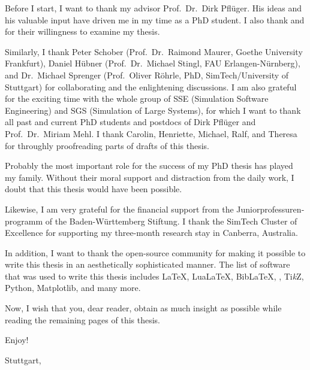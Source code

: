 
Before I start, I want to thank my advisor Prof.\ Dr.\ Dirk Pflüger.
His ideas and his valuable input have driven me in
my time as a PhD student.
I also thank \theexamineri{} and \theexaminerii{}
for their willingness to examine my thesis.

Similarly, I thank
Peter Schober
(Prof.\ Dr.\ Raimond Maurer, Goethe University Frankfurt),
Daniel Hübner
(Prof.\ Dr.\ Michael Stingl, FAU Erlangen-Nürnberg), and
Dr.\ Michael Sprenger
(Prof.\ Oliver Röhrle, PhD, SimTech/University of Stuttgart) for
collaborating and the enlightening discussions.
I am also grateful for the exciting time with the whole group of
SSE (Simulation Software Engineering) and
SGS (Simulation of Large Systems),
for which I want to thank all past and current PhD students and postdocs of
Dirk Pflüger and Prof.\ Dr.\ Miriam Mehl.
I thank Carolin, Henriette, Michael, Ralf, and Theresa
for throughly proofreading parts of drafts of this thesis.

Probably the most important role for the success of my PhD thesis
has played my family.
Without their moral support and distraction from the daily work,
I doubt that this thesis would have been possible.

Likewise, I am very grateful for the financial support from
the \foreignlanguage{ngerman}{Juniorprofessurenprogramm} of the
\foreignlanguage{ngerman}{Baden-Württemberg Stiftung}.
I thank the SimTech Cluster of Excellence for supporting
my three-month research stay in Canberra, Australia.

In addition, I want to thank the open-source community for making it possible to
write this thesis in an aesthetically sophisticated manner.
The list of software that was used to write this thesis includes
\LaTeX, Lua\LaTeX, Bib\LaTeX,
\scalebox{0.9}{\KOMAScript}, Ti\emph{k}Z, Python, Matplotlib,
and many more.

\label{page:preface}
Now, I wish that you, dear reader, obtain as much insight as possible
while reading the remaining
 pages of this thesis.

Enjoy!

\vspace{1em}

\noindent
Stuttgart, \thedate

\noindent
\theauthor

\cleardoublepage
